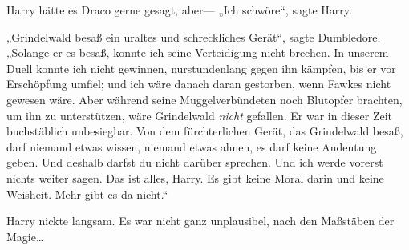 Harry hätte es Draco gerne gesagt, aber— „Ich schwöre“, sagte Harry.

„Grindelwald besaß ein uraltes und schreckliches Gerät“, sagte Dumbledore. „Solange er es besaß, konnte ich seine Verteidigung nicht brechen. In unserem Duell konnte ich nicht gewinnen, nurstundenlang gegen ihn kämpfen, bis er vor Erschöpfung umfiel; und ich wäre danach daran gestorben, wenn Fawkes nicht gewesen wäre. Aber während seine Muggelverbündeten noch Blutopfer brachten, um ihn zu unterstützen, wäre Grindelwald \emph{nicht} gefallen. Er war in dieser Zeit buchstäblich unbesiegbar. Von dem fürchterlichen Gerät, das Grindelwald besaß, darf niemand etwas wissen, niemand etwas ahnen, es darf keine Andeutung geben. Und deshalb darfst du nicht darüber sprechen. Und ich werde vorerst nichts weiter sagen. Das ist alles, Harry. Es gibt keine Moral darin und keine Weisheit. Mehr gibt es da nicht.“

Harry nickte langsam. Es war nicht ganz unplausibel, nach den Maßstäben der Magie…

